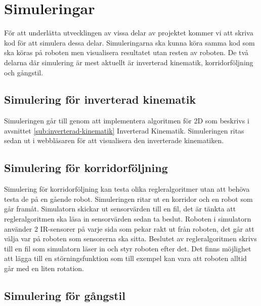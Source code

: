 \documentclass[a4paper,titlepage,12pt]{article}
\begin{document}
	\section{Simuleringar}
	För att underlätta utvecklingen av vissa delar av projektet kommer vi att skriva
	kod för att simulera dessa delar. Simuleringarna ska kunna köra samma kod som ska
	köras på roboten men visualisera resultatet utan resten av roboten. De två
	delarna där simulering är mest aktuellt är inverterad kinematik, korridorföljning 
	och gångstil.

	\subsection{Simulering för inverterad kinematik}
	Simuleringen går till genom att implementera algoritmen för 2D som beskrivs i avsnittet \ref{sub:inverterad-kinematik} Inverterad Kinematik. Simuleringen ritas sedan ut i webbläsaren för att visualisera den inverterade kinematiken.
	
	\subsection{Simulering för korridorföljning}
	Simulering för korridorföljning kan testa olika regleralgoritmer utan att behöva testa 
	de på en gående robot. Simuleringen ritar ut en korridor och en robot som går framåt. 
	Simulatorn skickar ut sensorvärden till en fil, det är tänkta att regleralgoritmen ska 
	läsa in sensorvärden sedan ta beslut. Roboten i simulatorn använder 2 IR-sensorer på varje 
	sida som pekar rakt ut från roboten, det går att välja var på roboten som sensorerna ska 
	sitta. Beslutet av regleralgoritmen skrivs till en fil som simulatorn läser in och 
	styr roboten efter det. Det finns möjlighet att lägga till en störningsfunktion som till 
	exempel kan vara att roboten alltid går med en liten rotation. 
	
	\subsection{Simulering för gångstil}
\end{document}
